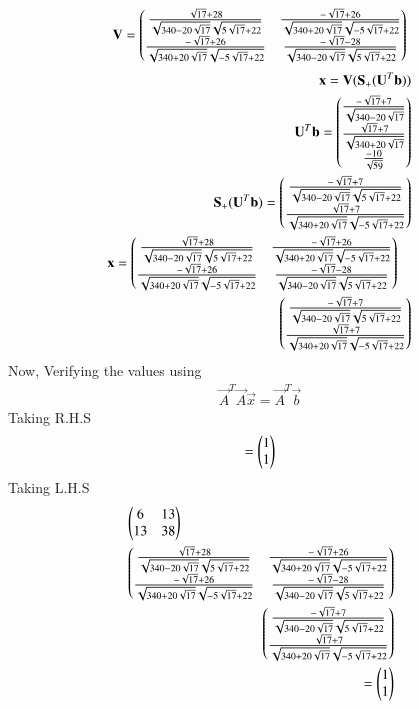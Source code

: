 \documentclass[journal,12pt,twocolumn]{IEEEtran}
\begin{document}
\begin{align}
\mathbf{V}=\begin{pmatrix}\frac{\sqrt{17}+28}{\sqrt{340-20\sqrt{17}}\sqrt{5\sqrt{17}+22}}&\frac{-\sqrt{17}+26}{\sqrt{340+20\sqrt{17}}\sqrt{-5\sqrt{17}+22}}\\\frac{-\sqrt{17}+26}{\sqrt{340+20\sqrt{17}}\sqrt{-5\sqrt{17}+22}}&\frac{-\sqrt{17}-28}{\sqrt{340-20\sqrt{17}}\sqrt{5\sqrt{17}+22}}\end{pmatrix}
\end{align}
\begin{align}
\vec{x}=\vec{V}(\vec{S}_+(\vec{U}^T\vec{b}))\\
\vec{U}^T\vec{b}=\myvec{\frac{-\sqrt{17}+7}{\sqrt{340-20\sqrt{17}}}\\\frac{\sqrt{17}+7}{\sqrt{340+20\sqrt{17}}}\\\frac{-10}{\sqrt{59}}}\\
\vec{S}_+(\vec{U}^T\vec{b})=\myvec{\frac{-\sqrt{17}+7}{\sqrt{340-20\sqrt{17}}\sqrt{5\sqrt{17}+22}}\\\frac{\sqrt{17}+7}{\sqrt{340+20\sqrt{17}}\sqrt{-5\sqrt{17}+22}}}\\
\begin{multlined}
\vec{x}=\myvec{\frac{\sqrt{17}+28}{\sqrt{340-20\sqrt{17}}\sqrt{5\sqrt{17}+22}}&\frac{-\sqrt{17}+26}{\sqrt{340+20\sqrt{17}}\sqrt{-5\sqrt{17}+22}}\\\frac{-\sqrt{17}+26}{\sqrt{340+20\sqrt{17}}\sqrt{-5\sqrt{17}+22}}&\frac{-\sqrt{17}-28}{\sqrt{340-20\sqrt{17}}\sqrt{5\sqrt{17}+22}}}\\
\myvec{\frac{-\sqrt{17}+7}{\sqrt{340-20\sqrt{17}}\sqrt{5\sqrt{17}+22}}\\\frac{\sqrt{17}+7}{\sqrt{340+20\sqrt{17}}\sqrt{-5\sqrt{17}+22}}}
\end{multlined}
\end{align}
Now, Verifying the values using
\begin{align}
\vec{A}^T\vec{A}\vec{x} = \vec{A}^T\vec{b}
\end{align}
Taking R.H.S
\begin{align}
=\begin{pmatrix}1\\1\end{pmatrix}
\end{align}
Taking L.H.S
\begin{align}
\begin{multlined}
\myvec{6&13\\13&38}\\\myvec{\frac{\sqrt{17}+28}{\sqrt{340-20\sqrt{17}}\sqrt{5\sqrt{17}+22}}&\frac{-\sqrt{17}+26}{\sqrt{340+20\sqrt{17}}\sqrt{-5\sqrt{17}+22}}\\\frac{-\sqrt{17}+26}{\sqrt{340+20\sqrt{17}}\sqrt{-5\sqrt{17}+22}}&\frac{-\sqrt{17}-28}{\sqrt{340-20\sqrt{17}}\sqrt{5\sqrt{17}+22}}}\\\myvec{\frac{-\sqrt{17}+7}{\sqrt{340-20\sqrt{17}}\sqrt{5\sqrt{17}+22}}\\\frac{\sqrt{17}+7}{\sqrt{340+20\sqrt{17}}\sqrt{-5\sqrt{17}+22}}}
\end{multlined}\\
=\myvec{1\\1}
\end{align}
 
\end{document}

